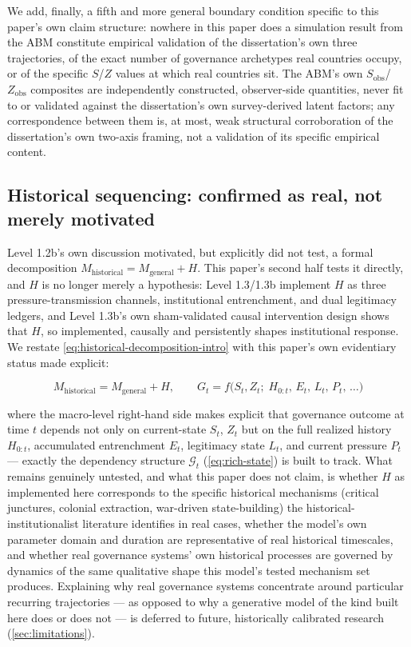 We add, finally, a fifth and more general boundary condition specific to
this paper's own claim structure: nowhere in this paper does a simulation
result from the ABM constitute empirical validation of the dissertation's
own three trajectories, of the exact number of governance archetypes real
countries occupy, or of the specific $S$/$Z$ values at which real countries
sit. The ABM's own $S_{\text{obs}}$/$Z_{\text{obs}}$ composites are
independently constructed, observer-side quantities, never fit to or
validated against the dissertation's own survey-derived latent factors;
any correspondence between them is, at most, weak structural corroboration
of the dissertation's own two-axis framing, not a validation of its
specific empirical content.

\subsection{Historical sequencing: confirmed as real, not merely motivated}
\label{sec:disc-historical-sequencing}

Level 1.2b's own discussion motivated, but explicitly did not test, a
formal decomposition $M_{\text{historical}} = M_{\text{general}} + H$. This
paper's second half tests it directly, and $H$ is no longer merely a
hypothesis: Level 1.3/1.3b implement $H$ as three pressure-transmission
channels, institutional entrenchment, and dual legitimacy ledgers, and
Level 1.3b's own sham-validated causal intervention design shows that $H$,
so implemented, causally and persistently shapes institutional response.
We restate \cref{eq:historical-decomposition-intro} with this paper's own
evidentiary status made explicit:

\begin{equation}
M_{\text{historical}} = M_{\text{general}} + H, \qquad
G_t = f\bigl(S_t, Z_t;\; H_{0:t},\, E_t,\, L_t,\, P_t,\, \ldots\bigr)
\label{eq:historical-decomposition-tested}
\end{equation}

where the macro-level right-hand side makes explicit that governance
outcome at time $t$ depends not only on current-state $S_t$, $Z_t$ but on
the full realized history $H_{0:t}$, accumulated entrenchment $E_t$,
legitimacy state $L_t$, and current pressure $P_t$ --- exactly the
dependency structure $\mathcal{G}_t$ (\cref{eq:rich-state}) is built to
track. What remains genuinely untested, and what this paper does not
claim, is whether $H$ as implemented here corresponds to the specific
historical mechanisms (critical junctures, colonial extraction, war-driven
state-building) the historical-institutionalist literature identifies in
real cases, whether the model's own parameter domain and duration are
representative of real historical timescales, and whether real governance
systems' own historical processes are governed by dynamics of the same
qualitative shape this model's tested mechanism set produces. Explaining
why real governance systems concentrate around particular recurring
trajectories --- as opposed to why a generative model of the kind built
here does or does not --- is deferred to future, historically calibrated
research (\cref{sec:limitations}).
